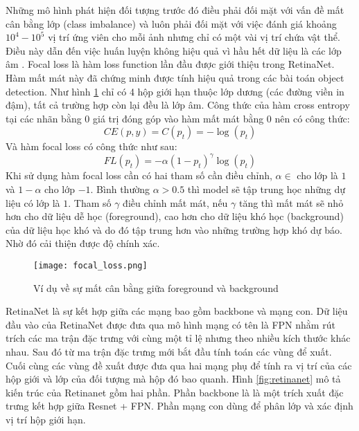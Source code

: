 \documentclass[../the.tex]{subfiles}
\begin{document}
{\fontsize{13}{12} \selectfont
	Những mô hình phát hiện đối tượng trước đó điều phải đối mặt với vấn đề mất cân bằng lớp (class imbalance) và luôn phải đối mặt với việc đánh giá khoảng $10^4 - 10^5$ vị trí ứng viên cho mỗi ảnh nhưng chỉ có một vài vị trí chứa vật thể.
	Điều này dẫn đến việc huấn luyện không hiệu quả vì hầu hết dữ liệu là các lớp âm \cite{lin2018focal}. Focal loss là hàm loss function lần đầu được giới thiệu trong RetinaNet. Hàm mất mát này đã chứng minh được tính hiệu quả trong các bài toán object detection.
	Như hình \ref{fig:focal_loss} chỉ có 4 hộp giới hạn thuộc lớp dương (các đường viền in đậm), tất cả trường hợp còn lại đều là lớp âm. Công thức của hàm cross entropy tại các nhãn bằng 0 giá trị đóng góp vào hàm mất mát bằng 0 nên có công thức:
	\begin{equation}
		CE(p,y) = C(p_t) =  -\log(p_t)
	\end{equation}
	Và hàm focal loss có công thức như sau:
	\begin{equation}
		FL(p_t) = -\alpha(1-p_t)^\gamma \log(p_t)
	\end{equation}
	Khi sử dụng hàm focal loss cần có hai tham số cần điều chỉnh, $\alpha \in$ cho lớp là $1$ và $1 - \alpha$ cho lớp $-1$.
	Bình thường $\alpha > 0.5$ thì model sẽ tập trung học những dự liệu có lớp là $1$. Tham số $\gamma$ điều chỉnh mất mát,
	nếu $\gamma$ tăng thì mất mát sẽ nhỏ hơn cho dữ liệu dễ học (foreground), cao hơn cho dữ liệu khó học (background) của dữ liệu học khó
	và do đó tập trung hơn vào những trường hợp khó dự báo. Nhờ đó cải thiện được độ chính xác.
}

\begin{figure}[H]
	\centering
	\texttt{[image: focal\_loss.png]}
	\caption{Ví dụ về sự mất cân bằng giữa  foreground và background\cite{lin2018focal}}
	\label{fig:focal_loss}
\end{figure}

{\fontsize{13}{12} \selectfont
	RetinaNet là sự kết hợp giữa các mạng bao gồm backbone và mạng con. Dữ
	liệu đầu vào của RetinaNet được đưa qua mô hình mạng có tên là FPN \cite{lin2017feature} nhằm rút trích các ma trận đặc trưng với
	cùng một tỉ lệ nhưng theo nhiều kích thước khác nhau. Sau đó từ ma trận đặc trưng mới bắt đầu tính toán các vùng để
	xuất. Cuối cùng các vùng đề xuất được đưa qua hai mạng phụ để tính ra vị trí của các hộp giới và lớp của đối
	tượng mà hộp đó bao quanh. Hình \ref{fig:retinanet} mô tả kiến trúc của Retinanet gồm hai phần. Phần backbone là
	là một trích xuất đặc trưng kết hợp giữa Resnet + FPN. Phần mạng con dùng để phân lớp và
	xác định vị trí hộp giới hạn.
}
\end{document}
